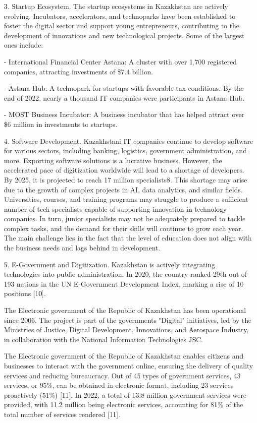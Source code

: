 \begin{multicols}{2}
3. Startup Ecosystem. The startup ecosystems in Kazakhstan are actively
evolving. Incubators, accelerators, and technoparks have been
established to foster the digital sector and support young
entrepreneurs, contributing to the development of innovations and new
technological projects. Some of the largest ones include:

- International Financial Center Astana: A cluster with over 1,700
registered companies, attracting investments of \$7.4 billion.

- Astana Hub: A technopark for startups with favorable tax conditions.
By the end of 2022, nearly a thousand IT companies were participants in
Astana Hub.

- MOST Business Incubator: A business incubator that has helped attract
over \$6 million in investments to startups.

4. Software Development. Kazakhstani IT companies continue to develop
software for various sectors, including banking, logistics, government
administration, and more. Exporting software solutions is a lucrative
business. However, the accelerated pace of digitization worldwide will
lead to a shortage of developers. By 2025, it is projected to reach 17
million specialists8. This shortage may arise due to the growth of
complex projects in AI, data analytics, and similar fields.
Universities, courses, and training programs may struggle to produce a
sufficient number of tech specialists capable of supporting innovation
in technology companies. In turn, junior specialists may not be
adequately prepared to tackle complex tasks, and the demand for their
skills will continue to grow each year. The main challenge lies in the
fact that the level of education does not align with the business needs
and lags behind in development.

5. E-Government and Digitization. Kazakhstan is actively integrating
technologies into public administration. In 2020, the country ranked
29th out of 193 nations in the UN E-Government Development Index,
marking a rise of 10 positions {[}10{]}.

The Electronic government of the Republic of Kazakhstan has been
operational since 2006. The project is part of the
government\textquotesingle s "Digital" initiatives, led by the
Ministries of Justice, Digital Development, Innovations, and Aerospace
Industry, in collaboration with the National Information Technologies
JSC.

The Electronic government of the Republic of Kazakhstan enables citizens
and businesses to interact with the government online, ensuring the
delivery of quality services and reducing bureaucracy. Out of 45 types
of government services, 43 services, or 95\%, can be obtained in
electronic format, including 23 services proactively (51\%) {[}11{]}. In
2022, a total of 13.8 million government services were provided, with
11.2 million being electronic services, accounting for 81\% of the total
number of services rendered {[}11{]}.


\end{multicols}
